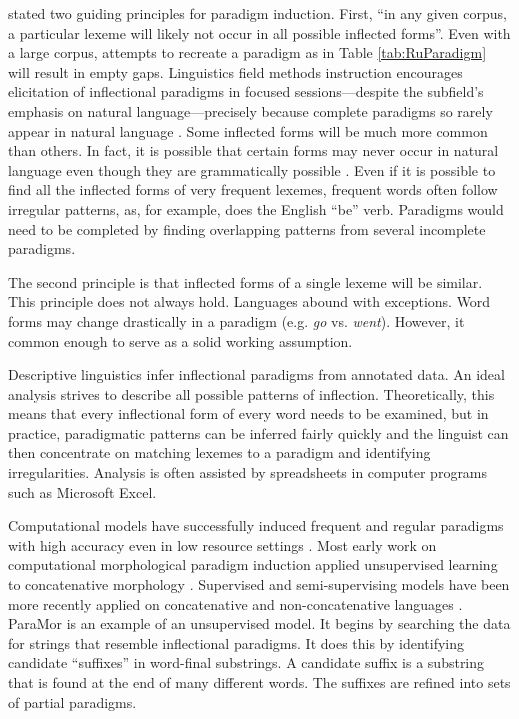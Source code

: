 \documentclass[12pt]{article}
\begin{document}
 stated two guiding principles for paradigm induction. First, ``in any given corpus, a particular lexeme will likely not occur in all possible inflected forms''.  Even with a large corpus, attempts to recreate a paradigm as in Table \ref{tab:RuParadigm} will result in empty gaps. Linguistics field methods instruction encourages elicitation of inflectional paradigms in focused sessions---despite the subfield's emphasis on natural language---precisely because complete paradigms so rarely appear in natural language \cite{lupke_data_2010,boerger_language_2016}. Some inflected forms will be much more common than others. In fact, it is possible that certain forms may never occur in natural language even though they are grammatically possible \cite{silfverberg_encoder-decoder_2018}. Even if it is possible to find all the inflected forms of very frequent lexemes, frequent words often follow irregular patterns, as, for example, does the English ``be'' verb. Paradigms would need to be completed by finding overlapping patterns from several incomplete paradigms. 

The second principle is that inflected forms of a single lexeme will be similar. This principle does not always hold. Languages abound with exceptions. Word forms may change drastically in a paradigm (e.g. \textit{go} vs. \textit{went}). However, it common enough to serve as a solid working assumption.

Descriptive linguistics infer inflectional paradigms from annotated data. An ideal analysis strives to describe all possible patterns of inflection. Theoretically, this means that every inflectional form of every word needs to be examined, but in practice, paradigmatic patterns can be inferred fairly quickly and the linguist can then concentrate on matching lexemes to a paradigm and identifying irregularities. Analysis is often assisted by spreadsheets in computer programs such as Microsoft Excel.

Computational models have successfully induced frequent and regular paradigms with high accuracy even in low resource settings \cite{hammarstrom_unsupervised_2011,durrett_supervised_2013,ahlberg_semi-supervised_2014}. Most early work on computational morphological paradigm induction applied unsupervised learning to concatenative morphology \cite{goldsmith_unsupervised_2001,chan_learning_2006,monson_paramorfinding_2007b}. Supervised and semi-supervising models have been more recently applied on concatenative and non-concatenative languages \cite{dreyer_discovering_2011,durrett_supervised_2013}. ParaMor \cite{monson_paramorMinimally_2007a} is an example of an unsupervised model. It begins by searching the data for strings that resemble inflectional paradigms. It does this by identifying candidate ``suffixes'' in word-final substrings. A candidate suffix is a substring that is found at the end of many different words. The suffixes are refined into sets of partial paradigms. 
\end{document}
